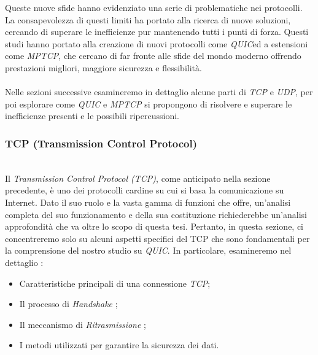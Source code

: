\noindent Queste nuove sfide hanno evidenziato una serie di problematiche nei protocolli. La consapevolezza di questi limiti ha portato alla ricerca di nuove soluzioni, cercando di superare le inefficienze pur mantenendo tutti i punti di forza.
Questi studi hanno portato alla creazione di nuovi protocolli come \emph{QUIC}\glsfirstoccur ed a estensioni come \emph{MPTCP}\glsfirstoccur, che cercano di far fronte alle sfide del mondo moderno offrendo prestazioni migliori, maggiore sicurezza e flessibilità.
\\
\\
Nelle sezioni successive esamineremo in dettaglio alcune parti di \emph{TCP} e \emph{UDP}, per poi esplorare come \emph{QUIC} e \emph{MPTCP} si propongono di risolvere e superare le inefficienze presenti e le possibili ripercussioni.

\subsubsection{TCP (Transmission Control Protocol)}
~\\
\indent Il \emph{Transmission Control Protocol (TCP)}, come anticipato nella sezione precedente, è uno dei protocolli cardine su cui si basa la comunicazione su Internet. Dato il suo ruolo e la vasta gamma di funzioni che offre, un'analisi completa del suo funzionamento e della sua costituzione richiederebbe un'analisi approfondità che va oltre lo scopo di questa tesi. Pertanto, in questa sezione, ci concentreremo solo su alcuni aspetti specifici del TCP che sono fondamentali per la comprensione del nostro studio su \emph{QUIC}. 
In particolare, esamineremo nel dettaglio :
\begin{itemize}
    \item Caratteristiche principali di una connessione \emph{TCP};
    
    \item Il processo di \emph{Handshake} \glsfirstoccur;
    
    \item Il meccanismo di \emph{Ritrasmissione \glsfirstoccur};
    
    \item I metodi utilizzati per garantire la sicurezza dei dati.
\end{itemize}


